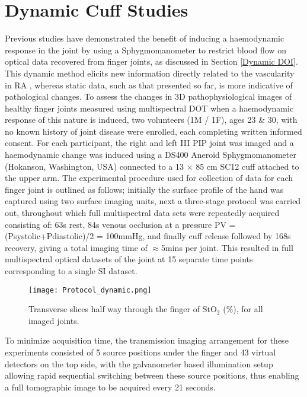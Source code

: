 \documentclass[twoside]{bhamthesis}
\theoremstyle{definition}
\begin{document}
\section{Dynamic Cuff Studies}

Previous studies have demonstrated the benefit of inducing a haemodynamic response in the joint by using a Sphygmomanometer to restrict blood flow on optical data recovered from finger joints, as discussed in Section \ref{Dynamic DOI}. This dynamic method elicits new information directly related to the vascularity in RA \cite{lasker2007dynamic}, whereas static data, such as that presented so far, is more indicative of pathological changes. To assess the changes in 3D pathophysiological images of healthy finger joints measured using multispectral DOT when a haemodynamic response of this nature is induced, two volunteers (1M / 1F), ages 23 \& 30, with no known history of joint disease were enrolled, each completing written informed consent. For each participant, the right and left III PIP joint was imaged and a haemodynamic change was induced using a DS400 Aneroid Sphygmomanometer (Hokanson, Washington, USA) connected to a 13 $\times$ 85 cm SC12 cuff attached to the upper arm. The experimental procedure used for collection of data for each finger joint is outlined as follows; initially the surface profile of the hand was captured using two surface imaging units, next a three-stage protocol was carried out, throughout which full multispectral data sets were repeatedly acquired consisting of: 63s rest, 84s venous occlusion at a pressure PV = (Psystolic+Pdiastolic)/2 = 100mmHg, and finally cuff release followed by 168s recovery, giving a total imaging time of $\approx$5mins per joint. This resulted in full multispectral optical datasets of the joint at 15 separate time points corresponding to a single SI dataset.

\begin{figure}[!ht]
\centering\texttt{[image: Protocol\_dynamic.png]}
\caption{Transverse slices half way through the finger of $\mathrm{StO_2}$ (\%), for all imaged joints.}
\end{figure}

To minimize acquisition time, the transmission imaging arrangement for these experiments consisted of 5 source positions under the finger and 43 virtual detectors on the top side, with the galvanometer based illumination setup allowing rapid sequential switching between these source positions, thus enabling a full tomographic image to be acquired every 21 seconds. 
\end{document}
